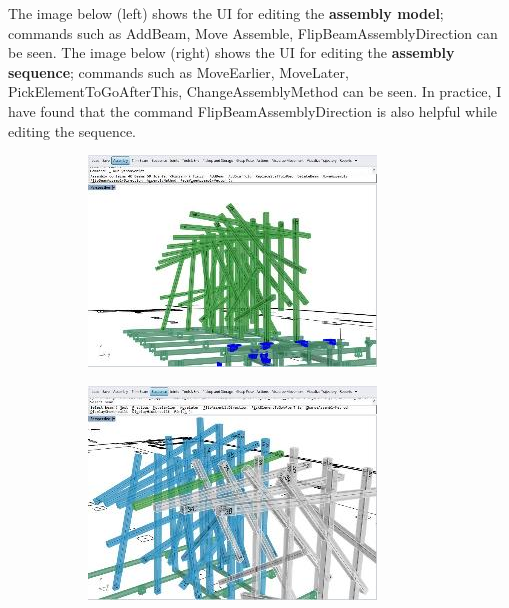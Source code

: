 \documentclass[11pt]{book}
\begin{document}
The image below (left) shows the UI for editing the \textbf{assembly model}; commands such as AddBeam, Move Assemble, FlipBeamAssemblyDirection can be seen. The image below (right) shows the UI for editing the \textbf{assembly sequence}; commands such as MoveEarlier, MoveLater, PickElementToGoAfterThis, ChangeAssemblyMethod can be seen. In practice, I have found that the command FlipBeamAssemblyDirection is also helpful while editing the sequence.

\begin{figure}[H]
\centering
\begin{subfigure}[b]{0.45\textwidth}
\centering
\includegraphics[width=\textwidth]{./images/image14.jpeg}
\end{subfigure}
\hfill
\begin{subfigure}[b]{0.45\textwidth}
\centering
\includegraphics[width=\textwidth]{./images/image15.jpeg}
\end{subfigure}
\end{figure}
\end{document}
